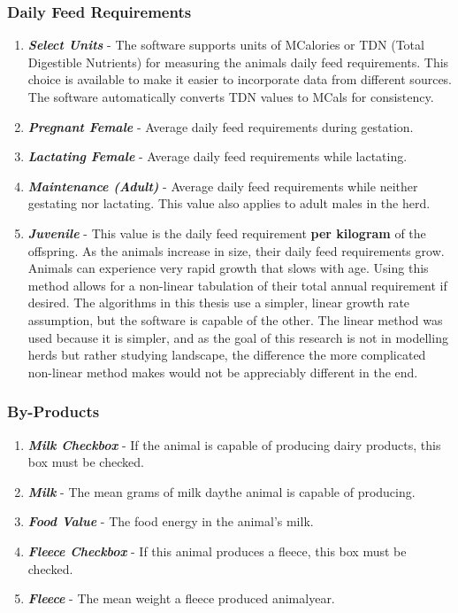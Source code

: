 \subsubsection{Daily Feed Requirements}
\begin{enumerate}
	\item \textit{\textbf{Select Units}} - The software supports units of MCalories or TDN (Total Digestible Nutrients) for measuring the animals daily feed requirements.  This choice is available to make it easier to incorporate data from different sources.  The software automatically converts TDN values to MCals for consistency. 
	\item \textit{\textbf{Pregnant Female}} -  Average daily feed requirements during gestation.
	\item \textit{\textbf{Lactating Female}} - Average daily feed requirements while lactating.
	\item \textit{\textbf{Maintenance (Adult)}} - Average daily feed requirements while neither gestating nor lactating.  This value also applies to adult males in the herd.
	\item \textit{\textbf{Juvenile}} - This value is the daily feed requirement \textbf{per kilogram} of the offspring.  As the animals increase in size, their daily feed requirements grow.  Animals can experience very rapid growth that slows with age.  Using this method allows for a non-linear tabulation of their total annual requirement if desired.  The algorithms in this thesis use a simpler, linear growth rate assumption, but the software is capable of the other.  The linear method was used because it is simpler, and as the goal of this research is not in modelling herds but rather studying landscape, the difference the more complicated non-linear method makes would not be appreciably different in the end. 
\end{enumerate}

\subsubsection{By-Products}
\begin{enumerate}
	\item \textit{\textbf{Milk Checkbox}} - If the animal is capable of producing dairy products, this box must be checked.
	\item \textit{\textbf{Milk}} - The mean grams of milk day\per the animal is capable of producing.
	\item \textit{\textbf{Food Value}} - The food energy in the animal's milk.
	\item \textit{\textbf{Fleece Checkbox}} - If this animal produces a fleece, this box must be checked.
	\item \textit{\textbf{Fleece}} - The mean weight a fleece produced animal\per year\per.
\end{enumerate}

